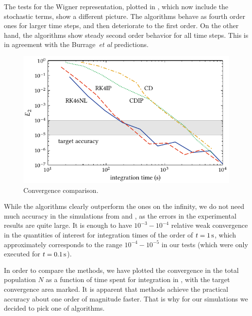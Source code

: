 The tests for the Wigner representation, plotted in , which now include the stochastic terms, show a different picture.
The  algorithms behave as fourth order ones for larger time steps, and then deteriorate to the first order.
On the other hand, the  algorithms show steady second order behavior for all time steps.
This is in agreement with the Burrage~\textit{et al} predictions.

\begin{figure}
    \centerline{%
    \includegraphics{figures_generated/test/convergence_by_time.pdf}}%

    \caption[Convergence tests, comparison]{
    Convergence comparison.}%

    \label{fig:numerical:convergence-by-time}
\end{figure}

While the  algorithms clearly outperform the  ones on the infinity, we do not need much accuracy in the simulations from  and , as the errors in the experimental results are quite large.
It is enough to have $10^{-3}-10^{-4}$ relative weak convergence in the quantities of interest for integration times of the order of $t=1\mbox{\ensuremath{\,\mathrm{s}}}$, which approximately corresponds to the range $10^{-4}-10^{-5}$ in our tests (which were only executed for $t=0.1\mbox{\ensuremath{\,\mathrm{s}}}$).

In order to compare the methods, we have plotted the convergence in the total population $N$ as a function of time spent for integration in , with the target convergence area marked.
It is apparent that  methods achieve the practical accuracy about one order of magnitude faster.
That is why for our simulations we decided to pick one of  algorithms.

